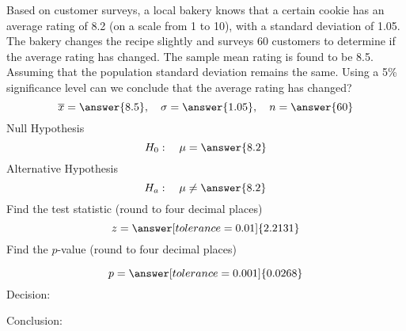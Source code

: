 \documentclass{ximera}
\begin{document}
 \begin{problem}\label{prob:140hom9prob3}
Based on customer surveys, a local bakery knows that a certain cookie has an average rating of 8.2 (on a scale from 1 to 10), with a standard deviation of 1.05.  The bakery changes the recipe slightly and  surveys 60 customers to determine if the average rating has changed.  The sample mean rating is found to be 8.5. Assuming that the population standard deviation remains the same. Using a 5\% significance level can we conclude that the average rating has changed?
$$\overline{x}=\answer{8.5},\quad \sigma=\answer{1.05},\quad n=\answer{60}$$
Null Hypothesis
$$H_0:\quad \mu=\answer{8.2}$$
Alternative Hypothesis
$$H_a:\quad \mu\neq\answer{8.2}$$
Find the test statistic (round to four decimal places)
$$z=\answer[tolerance=0.01]{2.2131}$$
Find the $p$-value (round to four decimal places)
\begin{center}  
\end{center}
$$p=\answer[tolerance=0.001]{0.0268}$$
Decision:

\begin{multipleChoice} 
\end{multipleChoice}  

Conclusion:

\begin{multipleChoice} 
\end{multipleChoice} 

\end{problem}
\end{document}
